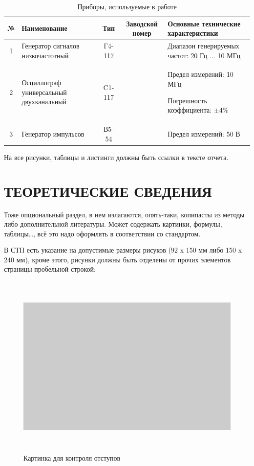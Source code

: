 \documentclass[a4paper,hidelinks,14pt]{extarticle}
\begin{document}
\begin{table}[h!]
	\caption{Приборы, используемые в работе}
	\renewcommand{\tabcolsep}{0.7em}
	\begin{tabularx}{\textwidth}{| c | X | c | c | X |} %
		\hline
		№ &  Наименование & Тип & Заводской номер & Основные технические характеристики \\ \hline
		
		1 & Генератор сигналов низкочастотный & Г4-117 & &
		Диапазон генерируемых частот: 20 Гц $ ... $ 10 МГц \\ \hline
		
		2 & Осциллограф универсальный двухканальный & C1-117 & &
		Предел измерений: 10 МГц \par
		Погрешность коэффициента: $ \pm4 \% $ \\ \hline
		
		3 & Генератор импульсов & В5-54 & &
		Предел измерений: 50 В \\ \hline  
	\end{tabularx}
\end{table}

На все рисунки, таблицы и листинги должны быть ссылки в тексте отчета.

\newpage

\section{ТЕОРЕТИЧЕСКИЕ СВЕДЕНИЯ}

Тоже опциональный раздел, в нем излагаются, опять-таки, копипасты из методы либо
дополнительной литературы.
Может содержать картинки, формулы, таблицы\dots, всё это надо оформлять
в соответствии со стандартом.

В СТП есть указание на допустимые размеры рисуков (92 x 150 мм либо 150 x 240 мм),
кроме этого, рисунки должны быть отделены от прочих элементов страницы пробельной строкой:

\begin{figure}[htbp]
	\centering
	\includegraphics[width=150mm,height=92mm]{fig/scheme_p}
	\caption{Картинка для контроля отступов}
\end{figure}
\end{document}
